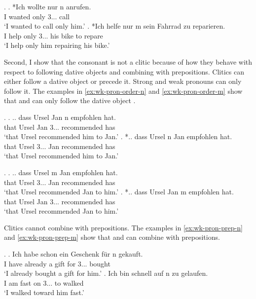 \ex.\label{ex:wk-pron-focus}
\ag. *Ich wollte nur n anrufen.\\
 I wanted only 3... call\\
 `I wanted to call only him.'
\bg. *Ich helfe nur m sein Fahrrad zu reparieren.\\
 I help only 3... his bike to repare\\
 `I help only him repairing his bike.'

Second, I show that the consonant is not a clitic because of how they behave with respect to following dative objects and combining with prepositions.
Clitics can either follow a dative object or precede it. Strong and weak pronouns can only follow it.
The examples in \ref{ex:wk-pron-order-n} and \ref{ex:wk-pron-order-m} show that  and  can only follow the dative object .

\ex.\label{ex:wk-pron-order-n}
\ag. .. dass Ursel Jan n empfohlen hat.\\
 {} that Ursel Jan 3... recommended has\\
 `that Ursel recommended him to Jan.'
\bg. *.. dass Ursel n Jan empfohlen hat.\\
{} that Ursel 3... Jan recommended has\\
`that Ursel recommended him to Jan.'

\ex.\label{ex:wk-pron-order-m}
\ag. .. dass Ursel m Jan empfohlen hat.\\
 {} that Ursel 3... Jan recommended has\\
 `that Ursel recommended Jan to him.'
\bg. *.. dass Ursel Jan m empfohlen hat.\\
{} that Ursel Jan 3... recommended has\\
`that Ursel recommended Jan to him.'

Clitics cannot combine with prepositions.
The examples in \ref{ex:wk-pron-prep-n} and \ref{ex:wk-pron-prep-m} show that  and  can combine with prepositions.

\ex.\label{ex:wk-pron-prep-n}
\ag. Ich habe schon ein Geschenk für n gekauft.\\
 I have already a gift for 3... bought\\
 `I already bought a gift for him.'
\bg. Ich bin schnell auf n zu gelaufen.\\
 I am fast on 3... to walked\\
 `I walked toward him fast.'


